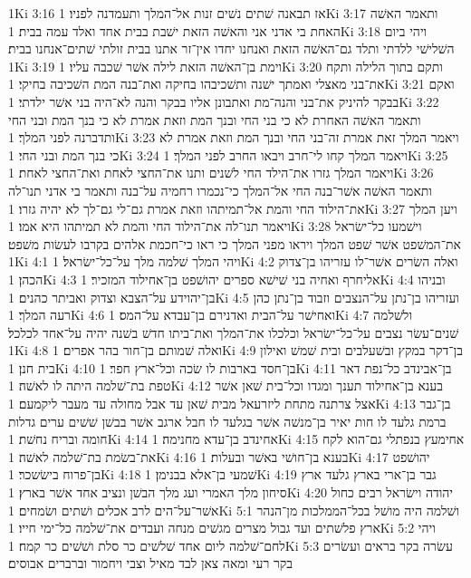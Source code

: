 1Ki 3:16  אז תבאנה שׁתים נשׁים זנות אל־המלך ותעמדנה לפניו׃
1Ki 3:17  ותאמר האשׁה האחת בי אדני אני והאשׁה הזאת ישׁבת בבית אחד ואלד עמה בבית׃
1Ki 3:18  ויהי ביום השׁלישׁי ללדתי ותלד גם־האשׁה הזאת ואנחנו יחדו אין־זר אתנו בבית זולתי שׁתים־אנחנו בבית׃
1Ki 3:19  וימת בן־האשׁה הזאת לילה אשׁר שׁכבה עליו׃
1Ki 3:20  ותקם בתוך הלילה ותקח את־בני מאצלי ואמתך ישׁנה ותשׁכיבהו בחיקה ואת־בנה המת השׁכיבה בחיקי׃
1Ki 3:21  ואקם בבקר להיניק את־בני והנה־מת ואתבונן אליו בבקר והנה לא־היה בני אשׁר ילדתי׃
1Ki 3:22  ותאמר האשׁה האחרת לא כי בני החי ובנך המת וזאת אמרת לא כי בנך המת ובני החי ותדברנה לפני המלך׃
1Ki 3:23  ויאמר המלך זאת אמרת זה־בני החי ובנך המת וזאת אמרת לא כי בנך המת ובני החי׃
1Ki 3:24  ויאמר המלך קחו לי־חרב ויבאו החרב לפני המלך׃
1Ki 3:25  ויאמר המלך גזרו את־הילד החי לשׁנים ותנו את־החצי לאחת ואת־החצי לאחת׃
1Ki 3:26  ותאמר האשׁה אשׁר־בנה החי אל־המלך כי־נכמרו רחמיה על־בנה ותאמר בי אדני תנו־לה את־הילוד החי והמת אל־תמיתהו וזאת אמרת גם־לי גם־לך לא יהיה גזרו׃
1Ki 3:27  ויען המלך ויאמר תנו־לה את־הילוד החי והמת לא תמיתהו היא אמו׃
1Ki 3:28  וישׁמעו כל־ישׂראל את־המשׁפט אשׁר שׁפט המלך ויראו מפני המלך כי ראו כי־חכמת אלהים בקרבו לעשׂות משׁפט׃
1Ki 4:1  ויהי המלך שׁלמה מלך על־כל־ישׂראל׃
1Ki 4:2  ואלה השׂרים אשׁר־לו עזריהו בן־צדוק הכהן׃
1Ki 4:3  אליחרף ואחיה בני שׁישׁא ספרים יהושׁפט בן־אחילוד המזכיר׃
1Ki 4:4  ובניהו בן־יהוידע על־הצבא וצדוק ואביתר כהנים׃
1Ki 4:5  ועזריהו בן־נתן על־הנצבים וזבוד בן־נתן כהן רעה המלך׃
1Ki 4:6  ואחישׁר על־הבית ואדנירם בן־עבדא על־המס׃
1Ki 4:7  ולשׁלמה שׁנים־עשׂר נצבים על־כל־ישׂראל וכלכלו את־המלך ואת־ביתו חדשׁ בשׁנה יהיה על־אחד לכלכל׃
1Ki 4:8  ואלה שׁמותם בן־חור בהר אפרים׃
1Ki 4:9  בן־דקר במקץ ובשׁעלבים ובית שׁמשׁ ואילון בית חנן׃
1Ki 4:10  בן־חסד בארבות לו שׂכה וכל־ארץ חפר׃
1Ki 4:11  בן־אבינדב כל־נפת דאר טפת בת־שׁלמה היתה לו לאשׁה׃
1Ki 4:12  בענא בן־אחילוד תענך ומגדו וכל־בית שׁאן אשׁר אצל צרתנה מתחת ליזרעאל מבית שׁאן עד אבל מחולה עד מעבר ליקמעם׃
1Ki 4:13  בן־גבר ברמת גלעד לו חות יאיר בן־מנשׁה אשׁר בגלעד לו חבל ארגב אשׁר בבשׁן שׁשׁים ערים גדלות חומה ובריח נחשׁת׃
1Ki 4:14  אחינדב בן־עדא מחנימה׃
1Ki 4:15  אחימעץ בנפתלי גם־הוא לקח את־בשׂמת בת־שׁלמה לאשׁה׃
1Ki 4:16  בענא בן־חושׁי באשׁר ובעלות׃
1Ki 4:17  יהושׁפט בן־פרוח בישׂשכר׃
1Ki 4:18  שׁמעי בן־אלא בבנימן׃
1Ki 4:19  גבר בן־ארי בארץ גלעד ארץ סיחון מלך האמרי ועג מלך הבשׁן ונציב אחד אשׁר בארץ׃
1Ki 4:20  יהודה וישׂראל רבים כחול אשׁר־על־הים לרב אכלים ושׁתים ושׂמחים׃
1Ki 5:1  ושׁלמה היה מושׁל בכל־הממלכות מן־הנהר ארץ פלשׁתים ועד גבול מצרים מגשׁים מנחה ועבדים את־שׁלמה כל־ימי חייו׃
1Ki 5:2  ויהי לחם־שׁלמה ליום אחד שׁלשׁים כר סלת ושׁשׁים כר קמח׃
1Ki 5:3  עשׂרה בקר בראים ועשׂרים בקר רעי ומאה צאן לבד מאיל וצבי ויחמור וברברים אבוסים׃
